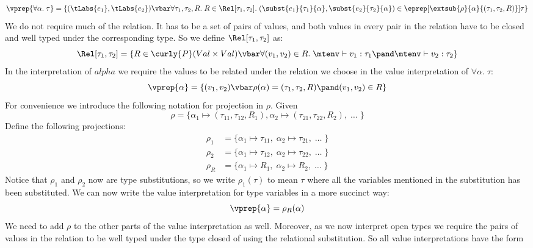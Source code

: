 \[
  \vprep{\forall \alpha.\; \tau}  = \{(\tLabs{e_1},\tLabs{e_2}) \vbar 
  \forall \tau_1 , \tau_2, R. \; 
    R \in \Rel[\tau_1,\tau_2].\;
      (\subst{e_1}{\tau_1}{\alpha},\subst{e_2}{\tau_2}{\alpha}) \in \eprep[\extsub{\rho}{\alpha}{(\tau_1,\tau_2,R)}]{\tau} \} 
\]
We do not require much of the relation. It has to be a set of pairs of values, and both values in every pair in the relation have to be closed and well typed under the corresponding type. So we define $\Rel[\tau_1,\tau_2]$ as:
\[
\Rel[\tau_1,\tau_2] = \{R \in \curly{P}(Val \times Val) \vbar \forall (v_1,v_2) \in R. \; \mtenv \vdash v_1 : \tau_1 \pand \mtenv \vdash v_2 : \tau_2 \}
\]
In the interpretation of $alpha$ we require the values to be related under the relation we choose in the value interpretation of $\forall \alpha. \; \tau$:
\[
  \vprep{\alpha} = \{ (v_1,v_2) \vbar \rho(\alpha) = (\tau_1,\tau_2,R) \pand (v_1,v_2) \in R \}
\]
For convenience we introduce the following notation for projection in $\rho$. Given
\[
  \rho = \{\alpha_1 \mapsto (\tau_{11},\tau_{12},R_1), \alpha_2 \mapsto (\tau_{21},\tau_{22},R_2),\; \dots\; \}
\]
Define the following projections:
\begin{align*}
  \rho_1 & = \{\alpha_1 \mapsto \tau_{11}, \; \alpha_2 \mapsto \tau_{21},\; \dots \;\} \\
  \rho_2 & = \{\alpha_1 \mapsto \tau_{12}, \; \alpha_2 \mapsto \tau_{22},\; \dots \;\} \\
  \rho_R & = \{\alpha_1 \mapsto R_1, \; \alpha_2 \mapsto R_2,\; \dots \;\} 
\end{align*}
Notice that $\rho_1$ and $\rho_2$ now are type substitutions, so we write $\rho_1(\tau)$ to mean $\tau$ where all the variables mentioned in the substitution has been substituted. We can now write the value interpretation for type variables in a more succinct way:
\[
  \vprep{\alpha} = \rho_R(\alpha)
\]
We need to add $\rho$ to the other parts of the value interpretation as well. Moreover, as we now interpret open types we require the pairs of values in the relation to be well typed under the type closed of using the relational substitution. So all value interpretations have the form
